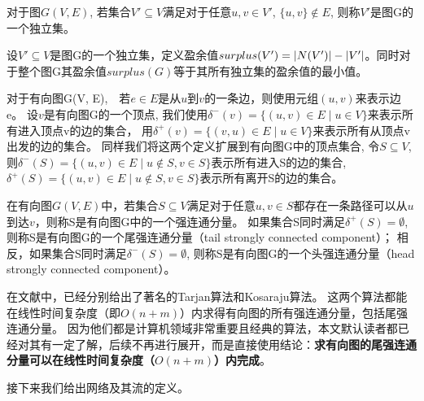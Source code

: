 \begin{definition}[独立集]
对于图$G(V, E)$, 若集合$V' \subseteq V$满足对于任意$u, v \in V'$, $\{u, v\} \notin E$, 则称$V'$是图G的一个独立集。
\end{definition}

设$V' \subseteq V$是图G的一个独立集，定义盈余值$surplus(V') = \left\vert N(V') \right\vert - \left\vert V' \right\vert$。同时对于整个图G其盈余值$surplus(G)$等于其所有独立集的盈余值的最小值。

对于有向图G(V, E),　若$e \in E$是从$u$到$v$的一条边，则使用元组$(u, v)$来表示边e。
设$v$是有向图G的一个顶点, 我们使用$\delta^-(v)=\{(u, v) \in E\;|\;u \in V\}$来表示所有进入顶点v的边的集合，
用$\delta^+(v)=\{(v, u) \in E\;|\;u \in V\}$来表示所有从顶点v出发的边的集合。
同样我们将这两个定义扩展到有向图G中的顶点集合, 令$S \subseteq V$,
则$\delta^-(S)=\{(u, v) \in E\;|\;u \notin S, v \in S\}$表示所有进入S的边的集合,
$\delta^+(S)=\{(u, v) \in E\;|\; u \notin S, v \in S\}$表示所有离开S的边的集合。

\begin{definition}
在有向图$G(V, E)$中，若集合$S \subseteq V$满足对于任意$u, v \in S$都存在一条路径可以从$u$到达$v$，则称S是有向图G中的一个强连通分量。
如果集合S同时满足$\delta^+(S) = \emptyset$, 则称S是有向图G的一个尾强连通分量（tail strongly connected component）；
相反，如果集合S同时满足$\delta^-(S) = \emptyset$, 则称S是有向图G的一个头强连通分量（head strongly connected component）。
\end{definition}

在文献\cite{tarjan1972depth,sharir1981strong}中，已经分别给出了著名的Tarjan算法和Kosaraju算法。
这两个算法都能在线性时间复杂度（即$O(n + m)$）内求得有向图的所有强连通分量，包括尾强连通分量。
因为他们都是计算机领域非常重要且经典的算法，本文默认读者都已经对其有一定了解，后续不再进行展开，而是直接使用结论：\textbf{求有向图的尾强连通分量可以在线性时间复杂度（$O(n + m)$）内完成}。

接下来我们给出网络及其流的定义。

